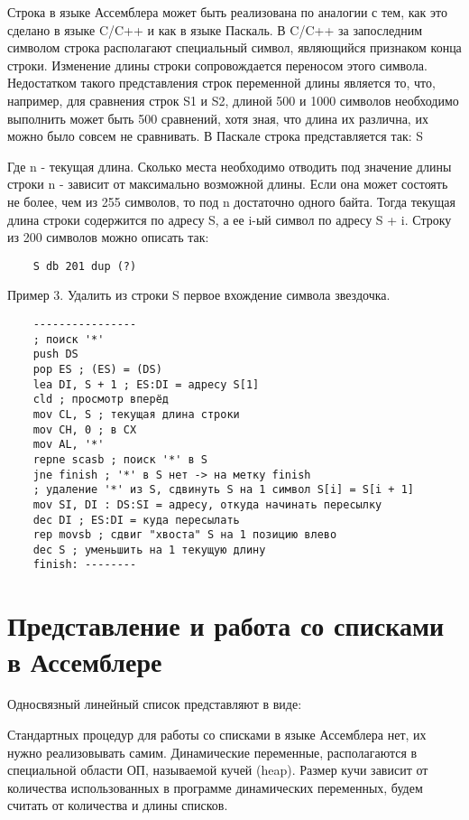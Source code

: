 Строка в языке Ассемблера может быть реализована по аналогии с тем, как это сделано в языке C/C++ и как в языке Паскаль. В C/C++ за запоследним символом строка располагают специальный символ, являющийся признаком конца строки.
Изменение длины строки сопровождается переносом этого символа. Недостатком такого представления строк переменной длины является то, что, например, для сравнения строк S1 и S2, длиной 500 и 1000 символов необходимо выполнить может быть 500 сравнений, хотя зная,
что длина их различна, их можно было совсем не сравнивать.
В Паскале строка представляется так:
S
\begin{figure}[H]
\end{figure}
Где n - текущая длина. Сколько места необходимо отводить под значение длины строки n - зависит от максимально возможной длины. Если она может состоять не более, чем из 255 символов, то под n достаточно одного байта.
Тогда текущая длина строки содержится по адресу S, а ее i-ый символ по адресу S + i. Строку из 200 символов можно описать так:
\begin{verbatim}
    S db 201 dup (?)
\end{verbatim}

Пример 3. Удалить из строки S первое вхождение символа звездочка.
\begin{verbatim}
    ----------------
    ; поиск '*'
    push DS
    pop ES ; (ES) = (DS)
    lea DI, S + 1 ; ES:DI = адресу S[1]
    cld ; просмотр вперёд
    mov CL, S ; текущая длина строки
    mov CH, 0 ; в CX
    mov AL, '*'
    repne scasb ; поиск '*' в S
    jne finish ; '*' в S нет -> на метку finish
    ; удаление '*' из S, сдвинуть S на 1 символ S[i] = S[i + 1]
    mov SI, DI : DS:SI = адресу, откуда начинать пересылку
    dec DI ; ES:DI = куда пересылать
    rep movsb ; сдвиг "хвоста" S на 1 позицию влево
    dec S ; уменьшить на 1 текущую длину
    finish: --------
\end{verbatim}

\section{Представление и работа со списками в  Ассемблере}

Односвязный линейный список представляют в виде:
\begin{figure}[H]
\end{figure}

Стандартных процедур для работы со списками в языке Ассемблера нет, их нужно реализовывать самим. Динамические переменные, располагаются в специальной области ОП, называемой кучей (heap). Размер кучи зависит от количества использованных в программе динамических переменных, будем считать от количества и длины списков.

